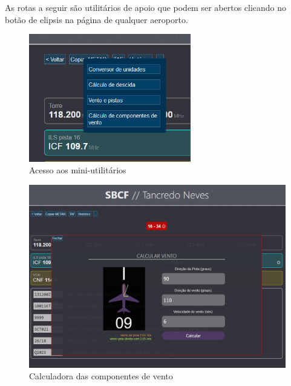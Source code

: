 As rotas a seguir são utilitários de apoio que podem ser abertos clicando
no botão de elipsis na página de qualquer aeroporto.

\begin{figure}[H]
    \begin{center}
    \includegraphics[width=200pt]{img/elipsis.png}
    \caption{Acesso aos mini-utilitários}
    \label{fig:menu-elipsis}
    \end{center}
\end{figure}

\begin{figure}[H]
    \begin{center}
    \includegraphics[width=\linewidth]{img/wind.png}
    \caption{Calculadora das componentes de vento}
    \label{fig:wind-calc}
    \end{center}
\end{figure}

